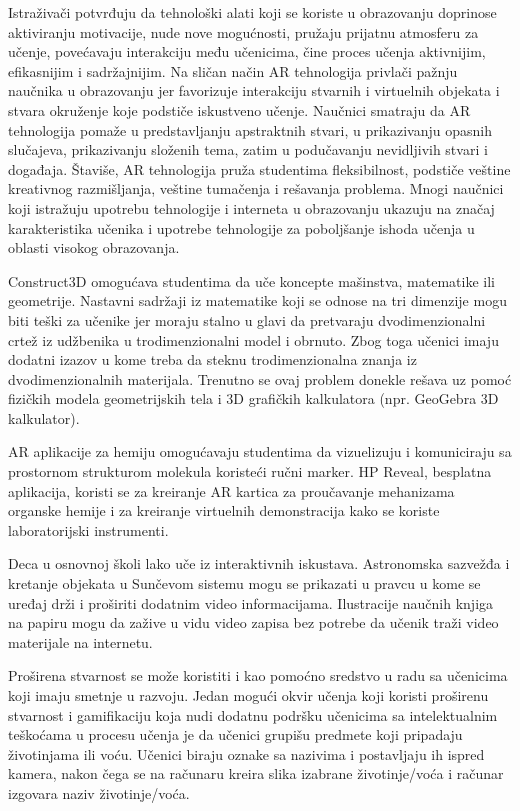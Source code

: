 \documentclass[a4paper]{article}
\begin{document}
	Istraživači potvrđuju da tehnološki alati koji se koriste u obrazovanju doprinose aktiviranju motivacije, nude nove mogućnosti, pružaju prijatnu atmosferu za učenje, 
	povećavaju interakciju među učenicima, čine proces učenja aktivnijim, efikasnijim i sadržajnijim. Na sličan način AR tehnologija privlači pažnju naučnika u obrazovanju 
	jer favorizuje interakciju stvarnih i virtuelnih objekata i stvara okruženje koje podstiče iskustveno učenje. Naučnici smatraju da AR tehnologija pomaže u predstavljanju 
	apstraktnih stvari, u prikazivanju opasnih slučajeva, prikazivanju složenih tema, zatim u podučavanju nevidljivih stvari i događaja. Štaviše, AR tehnologija pruža studentima 
	fleksibilnost, podstiče veštine kreativnog razmišljanja, veštine tumačenja i rešavanja problema. Mnogi naučnici koji istražuju upotrebu tehnologije i interneta u obrazovanju 
	ukazuju na značaj karakteristika učenika i upotrebe tehnologije za poboljšanje ishoda učenja u oblasti visokog obrazovanja.

	Construct3D omogućava studentima da uče koncepte mašinstva, matematike ili geometrije. Nastavni sadržaji iz matematike koji se odnose na tri dimenzije mogu biti teški za učenike 
	jer moraju stalno u glavi da pretvaraju dvodimenzionalni crtež iz udžbenika u trodimenzionalni model i obrnuto. Zbog toga učenici imaju dodatni izazov u kome treba da steknu 
	trodimenzionalna znanja iz dvodimenzionalnih materijala. Trenutno se ovaj problem donekle rešava uz pomoć fizičkih modela geometrijskih tela i 3D grafičkih kalkulatora (npr. GeoGebra 3D kalkulator).
	
	AR aplikacije za hemiju omogućavaju studentima da vizuelizuju i komuniciraju sa prostornom strukturom molekula koristeći ručni marker. HP Reveal, besplatna aplikacija, koristi 
	se za kreiranje AR kartica za proučavanje mehanizama organske hemije i za kreiranje virtuelnih demonstracija kako se koriste laboratorijski instrumenti.

	Deca u osnovnoj školi lako uče iz interaktivnih iskustava. Astronomska sazvežđa i kretanje objekata u Sunčevom sistemu mogu se prikazati u pravcu u kome se uređaj drži
	i proširiti dodatnim video informacijama. Ilustracije naučnih knjiga na papiru mogu da zažive u vidu video zapisa bez potrebe da učenik traži video materijale na internetu.

	Proširena stvarnost se može koristiti i kao pomoćno sredstvo u radu sa učenicima koji imaju smetnje u razvoju. Jedan mogući okvir učenja koji koristi proširenu stvarnost 
	i gamifikaciju koja nudi dodatnu podršku učenicima sa intelektualnim teškoćama u procesu učenja je da učenici grupišu predmete koji pripadaju životinjama ili voću. 
	Učenici biraju oznake sa nazivima i postavljaju ih ispred kamera, nakon čega se na računaru kreira slika izabrane životinje/voća i računar izgovara naziv životinje/voća.
\end{document}
